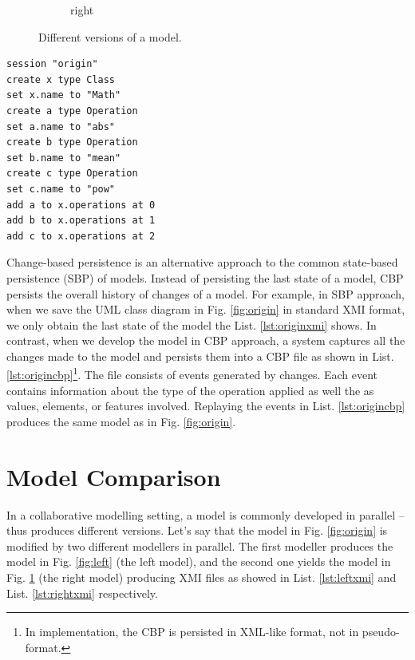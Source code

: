 \documentclass{llncs}
\begin{document}
\begin{minipage}[t]{0.59\linewidth}
\begin{figure}[H]
\begin{subfigure}[t]{0.2\linewidth}
    \caption{right}
    \label{fig:right}
\end{subfigure}
\hfill
\label{fig:versions}
\caption{Different versions of a model.}
\end{figure}
\end{minipage}
\hfill
\begin{minipage}[t]{0.39\linewidth}
\begin{lstlisting}[style=eol,caption={The pseudo-formatted CBP of the model in Fig. \ref{fig:origin}.},label=lst:origincbp]
session "origin"
create x type Class
set x.name to "Math" 
create a type Operation
set a.name to "abs" 
create b type Operation
set b.name to "mean" 
create c type Operation
set c.name to "pow" 
add a to x.operations at 0
add b to x.operations at 1
add c to x.operations at 2
\end{lstlisting}
\end{minipage}

Change-based persistence is an alternative approach to the common state-based persistence (SBP) of models. Instead of persisting the last state of a model, CBP persists the overall history of changes of a model. For example, in SBP approach, when we save the UML class diagram in Fig. \ref{fig:origin} in standard XMI format, we only obtain the last state of the model the List. \ref{lst:originxmi} shows. In contrast, when we develop the model in CBP approach, a system captures all the changes made to the model and persists them into a CBP file as shown in List. \ref{lst:origincbp}\footnote{In implementation, the CBP is persisted in XML-like format, not in pseudo-format.}. The file consists of events generated by changes. Each event contains information about the type of the operation applied as well the as values, elements, or features involved. Replaying the events in List. \ref{lst:origincbp} produces the same model as in Fig. \ref{fig:origin}.

\section{Model Comparison}
\label{sec:model_comparison}
In a collaborative modelling setting, a model is commonly developed in parallel -- thus produces different versions. Let's say that the model in Fig. \ref{fig:origin} is modified by two different modellers in parallel. The first modeller produces the model in Fig. \ref{fig:left} (the left model), and the second one yields the model in Fig. \ref{fig:right} (the right model) producing XMI files as showed in List. \ref{lst:leftxmi} and List. \ref{lst:rightxmi} respectively.
\end{document}
